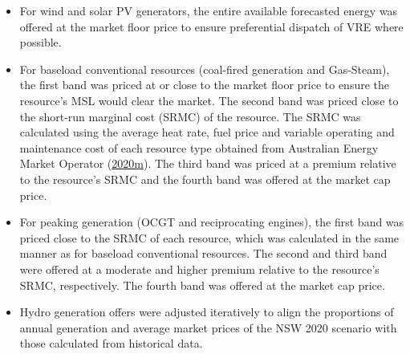 \documentclass[12pt,a4paper,]{report}
\providecommand{\tightlist}{%
  \setlength{\itemsep}{0pt}\setlength{\parskip}{0pt}}
\begin{document}
\begin{itemize}
\tightlist
\item
  For wind and solar PV generators, the entire available forecasted
  energy was offered at the market floor price to ensure preferential
  dispatch of VRE where possible.
\item
  For baseload conventional resources (coal-fired generation and
  Gas-Steam), the first band was priced at or close to the market floor
  price to ensure the resource's MSL would clear the market. The second
  band was priced close to the short-run marginal cost (SRMC) of the
  resource. The SRMC was calculated using the average heat rate, fuel
  price and variable operating and maintenance cost of each resource
  type obtained from Australian Energy Market Operator
  (\protect\hyperlink{ref-australianenergymarketoperator2020InputsAssumptions2020}{2020m}).
  The third band was priced at a premium relative to the resource's SRMC
  and the fourth band was offered at the market cap price.
\item
  For peaking generation (OCGT and reciprocating engines), the first
  band was priced close to the SRMC of each resource, which was
  calculated in the same manner as for baseload conventional resources.
  The second and third band were offered at a moderate and higher
  premium relative to the resource's SRMC, respectively. The fourth band
  was offered at the market cap price.
\item
  Hydro generation offers were adjusted iteratively to align the
  proportions of annual generation and average market prices of the NSW
  2020 scenario with those calculated from historical data.
\end{itemize}

\def\pandoctableshortcapt{Offers by resource type for NSW and SA across
all scenarios}
\end{document}
